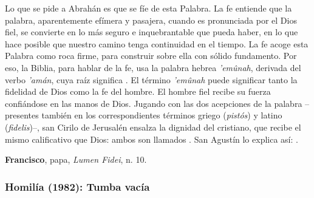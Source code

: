 \begin{patercite}
Lo que se pide a Abrahán es que se fíe de esta Palabra. La fe entiende que la palabra, aparentemente efímera y pasajera, cuando es pronunciada por el Dios fiel, se convierte en lo más seguro e inquebrantable que pueda haber, en lo que hace posible que nuestro camino tenga continuidad en el tiempo. La fe acoge esta Palabra como roca firme, para construir sobre ella con sólido fundamento. Por eso, la Biblia, para hablar de la fe, usa la palabra hebrea \textit{’emûnah}, derivada del verbo \textit{’amán}, cuya raíz significa . El término \textit{’emûnah} puede significar tanto la fidelidad de Dios como la fe del hombre. El hombre fiel recibe su fuerza confiándose en las manos de Dios. Jugando con las dos acepciones de la palabra --presentes también en los correspondientes términos griego (\textit{pistós}) y latino (\textit{fidelis})--, san Cirilo de Jerusalén ensalza la dignidad del cristiano, que recibe el mismo calificativo que Dios: ambos son llamados . San Agustín lo explica así: .
	
	\textbf{Francisco}, papa, \textit{Lumen Fidei}, n. 10.
\end{patercite}

\newpage 

\subsubsection{Homilía (1982): Tumba vacía}


